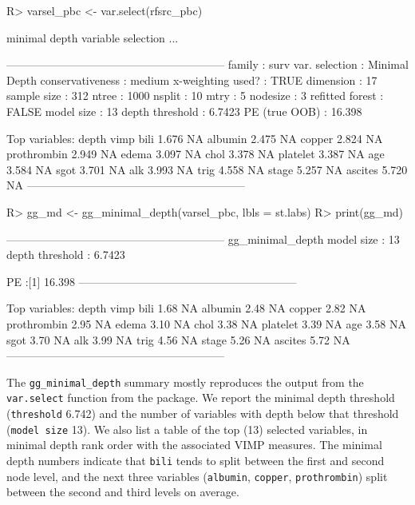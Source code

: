 \documentclass[article]{jss}
\begin{document}
\begin{Schunk}
\begin{Sinput}
R> varsel_pbc <- var.select(rfsrc_pbc)
\end{Sinput}
\begin{Soutput}
minimal depth variable selection ...


-----------------------------------------------------------
family             : surv 
var. selection     : Minimal Depth 
conservativeness   : medium 
x-weighting used?  : TRUE 
dimension          : 17 
sample size        : 312 
ntree              : 1000 
nsplit             : 10 
mtry               : 5 
nodesize           : 3 
refitted forest    : FALSE 
model size         : 13 
depth threshold    : 6.7423 
PE (true OOB)      : 16.398 


Top variables:
            depth vimp
bili        1.676   NA
albumin     2.475   NA
copper      2.824   NA
prothrombin 2.949   NA
edema       3.097   NA
chol        3.378   NA
platelet    3.387   NA
age         3.584   NA
sgot        3.701   NA
alk         3.993   NA
trig        4.558   NA
stage       5.257   NA
ascites     5.720   NA
-----------------------------------------------------------
\end{Soutput}
\begin{Sinput}
R> gg_md <- gg_minimal_depth(varsel_pbc, lbls = st.labs)
R> print(gg_md)
\end{Sinput}
\begin{Soutput}
-----------------------------------------------------------
gg_minimal_depth
model size         : 13 
depth threshold    : 6.7423 

PE :[1] 16.398
-----------------------------------------------------------

Top variables:
            depth vimp
bili         1.68   NA
albumin      2.48   NA
copper       2.82   NA
prothrombin  2.95   NA
edema        3.10   NA
chol         3.38   NA
platelet     3.39   NA
age          3.58   NA
sgot         3.70   NA
alk          3.99   NA
trig         4.56   NA
stage        5.26   NA
ascites      5.72   NA
-----------------------------------------------------------
\end{Soutput}
\end{Schunk}

The \texttt{gg\_minimal\_depth} summary mostly reproduces the output
from the \texttt{var.select} function from the 
package. We report the minimal depth threshold (\texttt{threshold}
6.742) and the number of variables with depth below that threshold
(\texttt{model\ size} 13). We also list a table of the top (13) selected
variables, in minimal depth rank order with the associated VIMP
measures. The minimal depth numbers indicate that \texttt{bili} tends to
split between the first and second node level, and the next three
variables (\texttt{albumin}, \texttt{copper}, \texttt{prothrombin})
split between the second and third levels on average.
\end{document}
